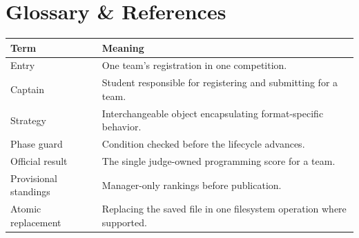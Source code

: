 \clearpage\section{Glossary \& References}
\begin{tabularx}{\linewidth}{lY}\toprule Term & Meaning\\\midrule
Entry & One team's registration in one competition.\\
Captain & Student responsible for registering and submitting for a team.\\
Strategy & Interchangeable object encapsulating format-specific behavior.\\
Phase guard & Condition checked before the lifecycle advances.\\
Official result & The single judge-owned programming score for a team.\\
Provisional standings & Manager-only rankings before publication.\\
Atomic replacement & Replacing the saved file in one filesystem operation where supported.\\\bottomrule\end{tabularx}

